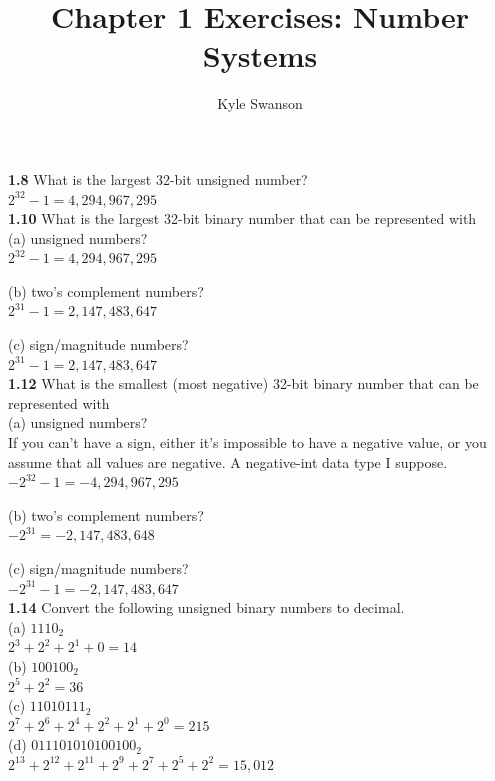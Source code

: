 \documentclass[12pt,a4paper]{report}
\author{Kyle Swanson}
\title{Chapter 1 Exercises: Number Systems}
\begin{document}
\maketitle

\begin{normalsize}



\textbf{1.8} What is the largest 32-bit unsigned number?\\
$ 2^{32}-1 = 4,294,967,295$ \\

\textbf{1.10} What is the largest 32-bit binary number that can be represented with\\
(a) unsigned numbers?\\
$ 2^{32}-1 = 4,294,967,295 $

(b) two's complement numbers?\\
$ 2^{31}-1 = 2,147,483,647 $

(c) sign/magnitude numbers?\\
$ 2^{31}-1 = 2,147,483,647 $ \\

\textbf{1.12} What is the smallest (most negative) 32-bit binary number that can be represented with\\
(a) unsigned numbers?\\
If you can't have a sign, either it's impossible to have a negative value, or you assume that all values are negative. A negative-int data type I suppose.
$ -2^{32}-1 = -4,294,967,295 $

(b) two's complement numbers?\\
$ -2^{31} = -2,147,483,648 $

(c) sign/magnitude numbers?\\
$ -2^{31}-1 = -2,147,483,647 $ \\

\textbf{1.14} Convert the following unsigned binary numbers to decimal.\\
(a) $ 1110_{2} $ \\
$ 2^{3} + 2^{2} + 2^{1} + 0 = 14 $ \\
(b) $ 10 0100_{2} $ \\
$ 2^{5} + 2^{2} = 36 $ \\
(c) $ 1101 0111_{2} $ \\
$ 2^{7} + 2^{6} + 2^{4} + 2^{2} + 2^{1} + 2^{0} = 215 $ \\
(d) $ 011 1010 1010 0100_{2} $ \\
$ 2^{13} + 2^{12} + 2^{11} + 2^{9} + 2^{7} + 2^{5} + 2^{2} = 15,012 $ \\


\end{normalsize}
\end{document}
